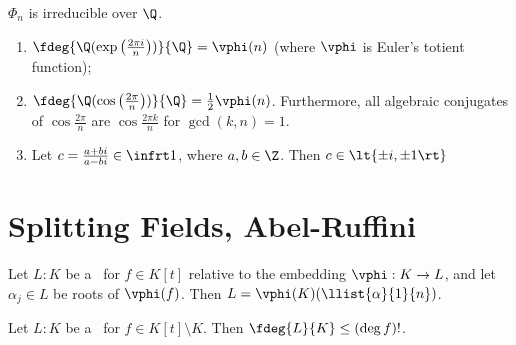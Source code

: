 \documentclass{article}
\begin{document}
\begin{ttheorem}
  \( \Phi_n \) is irreducible over \( \Q \).
\end{ttheorem}

\begin{tcorollary}
  \begin{enumerate}[label=\nf{(\alph*)}]
    \item \( \fdeg{\Q(\exp\left(\frac{2\pi i}{n}\right))}{\Q} = \vphi(n) \) (where \( \vphi \) is Euler's totient function);
    \item \( \fdeg{\Q(\cos\left(\frac{2\pi }{n}\right))}{\Q} = \frac{1}{2}\vphi(n) \).
    Furthermore, all algebraic conjugates of \( \cos \frac{2\pi}{n} \) are \( \cos \frac{2\pi k}{n} \) for \( \gcd(k,n)=1 \).
    \item Let \( c = \frac{a+bi}{a-bi}\in \infrt 1 \), where \( a,b\in \Z \). Then \( c\in \lt\{ \pm i,\pm 1 \rt\} \)
  \end{enumerate}
\end{tcorollary}


\section{Splitting Fields, Abel-Ruffini}

\begin{tlemma}
  Let \( L:K \) be a \sfe~for \( f\in K[t] \) relative to the embedding \( \vphi:K\to L \), and let \( \alpha_j\in L \) be roots of \( \vphi(f) \).
  Then \( L=\vphi(K)(\llist{\alpha}{1}{n}) \).
\end{tlemma}

\begin{tlemma}
  Let \( L:K \) be a \sfe~for \( f\in K[t]\setminus K \).
  Then \( \fdeg{L}{K}\leq (\deg f)! \).
\end{tlemma}
\end{document}
